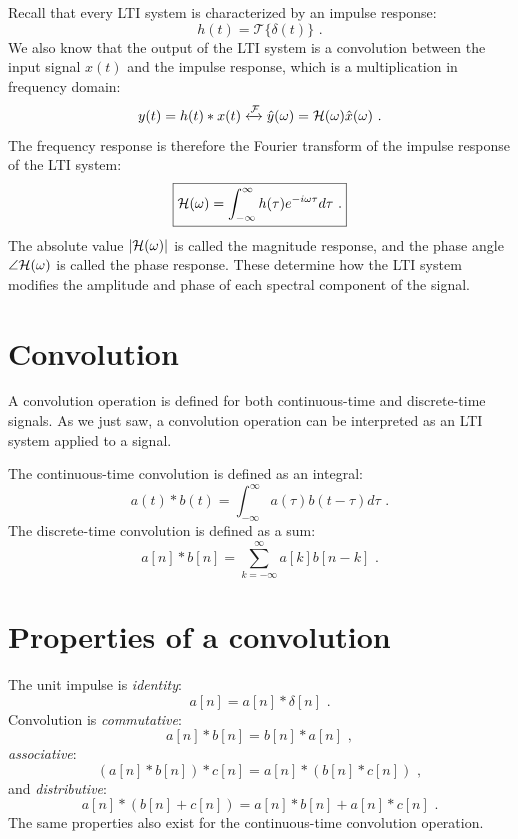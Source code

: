 Recall that every LTI system is characterized by an impulse response:
\begin{equation}
h(t) = \mathcal{T}\{\delta(t)\}\,\,.
\end{equation}
We also know that the output of the LTI system is a convolution between the input signal $x(t)$ and the impulse response, which is a multiplication in frequency domain:
\begin{equation}
y(t) = h(t)*x(t) \xleftrightarrow{\mathcal{F}} \hat{y}(\omega) = \mathcal{H}(\omega) \hat{x}(\omega)\,\,.
\end{equation}
The frequency response is therefore the Fourier transform of the impulse response of the LTI system:
\begin{equation}
\boxed{
\mathcal{H}(\omega) = \int_{-\infty}^{\infty} h(\tau)e^{-i\omega \tau}  d\tau\,\,.
}
\end{equation}
The absolute value $|\mathcal{H}(\omega)|$ is called the  magnitude response, and the phase angle $\angle \mathcal{H}(\omega)$ is called the  phase response. These determine how the LTI system modifies the amplitude and phase of each spectral component of the signal.

\newpage
\section{Convolution}

A convolution operation is defined for both continuous-time and
discrete-time signals. As we just saw, a convolution operation can be
interpreted as an LTI system applied to a signal.

The continuous-time convolution is defined as an integral:
\begin{equation}
\boxed{
  a(t)*b(t) = \int_{-\infty}^{\infty}a(\tau)b(t-\tau)d\tau\,\,.
}
\end{equation}
The discrete-time convolution is defined as a sum:
\begin{equation}
\boxed{
  a[n]*b[n] = \sum_{k=-\infty}^{\infty}a[k]b[n-k]\,\,.
}
\end{equation}

\section{Properties of a convolution}

The unit impulse is \emph{identity}:
\begin{equation}
  \boxed{
    a[n] = a[n]*\delta[n]\,\,.
    } 
\end{equation}
Convolution is \emph{commutative}:
\begin{equation}
  \boxed{
    a[n]*b[n] = b[n]*a[n]\,\,,
    }
\end{equation}
\emph{associative}:
\begin{equation}
    \boxed{
      (a[n]*b[n])*c[n] = a[n]*(b[n]*c[n])\,\,,
      }
\end{equation}
and \emph{distributive}:
\begin{equation}
    \boxed{
      a[n]*(b[n]+c[n]) = a[n]*b[n] + a[n]*c[n]\,\,.
      }
\end{equation}
The same properties also exist for the continuous-time convolution
operation.


